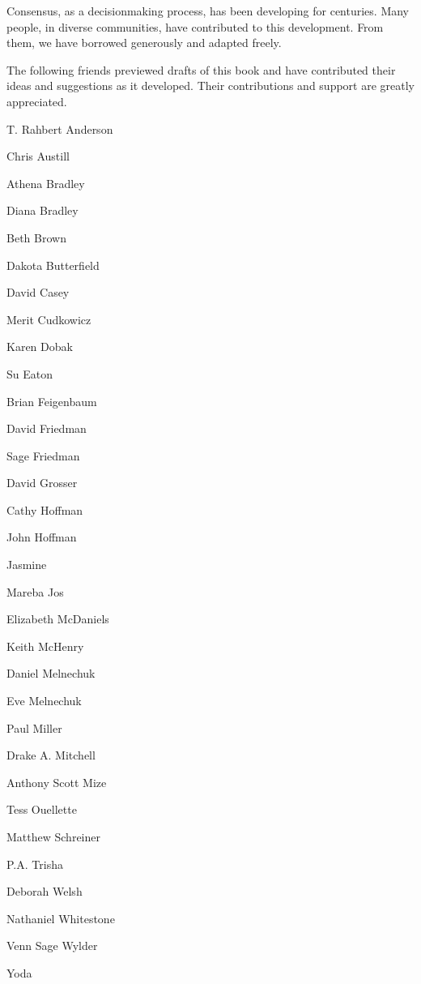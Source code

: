 Consensus, as a decisionmaking process, has been developing for centuries. Many people, in diverse communities, have contributed to this development. From them, we have borrowed generously and adapted freely.
 
The following friends previewed drafts of this book and have contributed their ideas and suggestions as it developed. Their contributions and support are greatly appreciated.

\begin{multicols}{2}
\squishlist %
	\item T. Rahbert Anderson
	\item Chris Austill
	\item Athena Bradley
	\item Diana Bradley
	\item Beth Brown
	\item Dakota Butterfield 
	\item David Casey
	\item Merit Cudkowicz
	\item Karen Dobak
	\item Su Eaton
	\item Brian Feigenbaum
	\item David Friedman
	\item Sage Friedman
	\item David Grosser
	\item Cathy Hoffman
	\item John Hoffman
	\item Jasmine
	\item Mareba Jos
	\item Elizabeth McDaniels
	\item Keith McHenry
	\item Daniel Melnechuk
	\item Eve Melnechuk
	\item Paul Miller
	\item Drake A. Mitchell
	\item Anthony Scott Mize
	\item Tess Ouellette
	\item Matthew Schreiner
	\item P.A. Trisha
	\item Deborah Welsh
	\item Nathaniel Whitestone
	\item Venn Sage Wylder
	\item Yoda
\squishend %
\end{multicols}
%